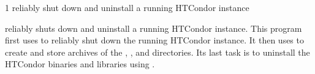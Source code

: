 \begin{ManPage}{\label{man-condor-cold-stop}}{1}
{reliably shut down and uninstall a running HTCondor instance}

\Synopsis {}



\Description 
{} reliably shuts down and uninstall a
running HTCondor instance.  
This program first uses  to
reliably shut down the running HTCondor instance.
It then uses  to create and store archives of the
, , and  directories.
Its last task is to 
uninstall the HTCondor binaries and libraries using .


\end{ManPage}
